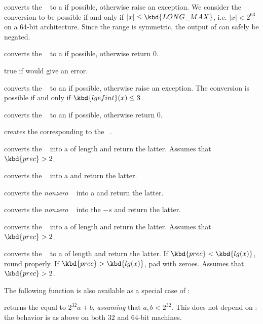  converts the ~ to a  if
possible, otherwise raise an exception. We consider the conversion
to be possible if and only if $|x| \leq \kbd{LONG\_MAX}$, i.e. $|x| < 2^{63}$
on a 64-bit architecture. Since the range is symmetric, the output of
 can safely be negated.

 converts the ~ to a  if
possible, otherwise return $0$.

 true if  would give an error.

 converts the ~ to an  if
possible, otherwise raise an exception. The conversion is possible if
and only if $\kbd{lgefint}(x) \leq 3$.

 converts the ~ to an
 if possible, otherwise return $0$.

 creates the  corresponding to the
~.

 converts the ~ into a
 of length  and return the latter. Assumes that
$\kbd{prec} > 2$.

 converts the ~ into a 
and return the latter.

 converts the \emph{nonzero} ~
into a  and return the latter.

 converts the \emph{nonzero} ~
into the  $-s$ and return the latter.

 converts the ~ into a
 of length  and return the latter. Assumes that
$\kbd{prec} > 2$.

 converts the ~ to a
 of length  and return the latter. If
$\kbd{prec} < \kbd{lg(x)}$, round properly. If $\kbd{prec} > \kbd{lg(x)}$,
pad with zeroes. Assumes that $\kbd{prec} > 2$.

\noindent The following function is also available as a special case of
:

 returns the  equal to $2^{32} a +
b$, \emph{assuming} that $a,b < 2^{32}$. This does not depend on
: the behavior is as above on both $32$ and $64$-bit
machines.

